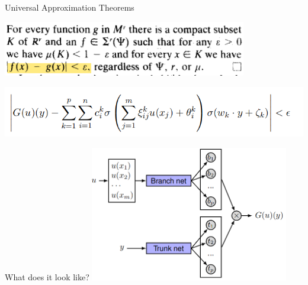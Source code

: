 \documentclass[aspectratio=169]{beamer}
\begin{document}
\begin{frame}{Universal Approximation Theorems}

  \begin{minipage}{0.5\textwidth}
    \color{Pink}{Universal Approximation Theorem for Function}\color{Black}
    \centering

    \includegraphics[width=0.8\textwidth]{Figures/fun.png}\cite{hornik1989}
  \end{minipage}%
  \begin{minipage}{0.5\textwidth}
    \color{Pink}{Universal Approximation Theorem for Operator}\color{Black}
    \centering

    \includegraphics[width=\textwidth]{Figures/op.png}\cite{chen1995}

  \end{minipage}

\end{frame}

\begin{frame}{What does it look like?}
  \centering
  \includegraphics[width=0.65\textwidth]{Figures/pic.png}
\end{frame}
\end{document}
